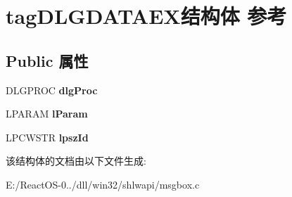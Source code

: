 \hypertarget{structtag_d_l_g_d_a_t_a_e_x}{}\section{tag\+D\+L\+G\+D\+A\+T\+A\+E\+X结构体 参考}
\label{structtag_d_l_g_d_a_t_a_e_x}
\subsection*{Public 属性}
\begin{DoxyCompactItemize}
\item 
\mbox{\label{structtag_d_l_g_d_a_t_a_e_x_a1ba579faa4cea310fff1f4ed56a48eb5}} 
D\+L\+G\+P\+R\+OC {\bfseries dlg\+Proc}
\item 
\mbox{\label{structtag_d_l_g_d_a_t_a_e_x_ab32c4f5293b4a3ce6e5f540582d38dfe}} 
L\+P\+A\+R\+AM {\bfseries l\+Param}
\item 
\mbox{\label{structtag_d_l_g_d_a_t_a_e_x_a5d0cf859b4c2bb25e9367b4ef5944af7}} 
L\+P\+C\+W\+S\+TR {\bfseries lpsz\+Id}
\end{DoxyCompactItemize}


该结构体的文档由以下文件生成\+:\begin{DoxyCompactItemize}
\item 
E\+:/\+React\+O\+S-\/0../dll/win32/shlwapi/msgbox.\+c\end{DoxyCompactItemize}
